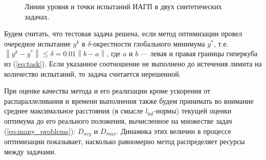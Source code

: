\documentclass[11pt, oneside, a4paper]{article}
\begin{document}
\begin{figure}[ht]
    \centering
    \caption{Линии уровня и точки испытаний ИАГП в двух синтетических задачах.}
    \label{fig:isolines}
\end{figure}

Будем считать, что тестовая задача решена, если метод оптимизации провел очередное испытание \(y^k\) в
\(\delta\)-окрестности глобального минимума \(y^*\), т.е. $\left\|y^k-
y^*\right\|\leqslant \delta = 0.01\left\|b-a\right\|$, где \(a\) и \(b\) --- левая и правая границы гиперкуба из (\ref{eq:task}).
Если указанное соотношение не выполнено до истечения лимита на количество испытаний, то задача считается нерешенной.

При оценке качества метода и его реализации кроме ускорения от распараллеливания и времени выполнения также будем принимать во внимание среднее максимальное расстояния (в смысле \(l_{\inf}\)-нормы) текущей оценки оптимума до его реального положения,
вычисленное на множестве задач (\ref{eq:many_problems}): \(D_{avg}\) и \(D_{max}\). Динамика этих величин в процессе оптимизации
показывает, насколько равномерно метод распределяет ресурсы между задачами.
\end{document}
